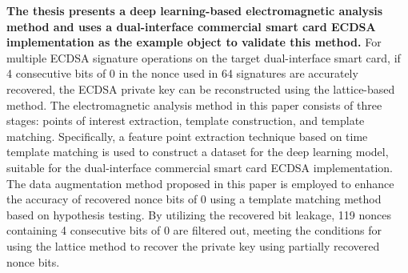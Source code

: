 \textbf{The thesis presents a deep learning-based electromagnetic analysis method and uses a dual-interface commercial smart card ECDSA implementation as the example object to validate this method.} For multiple ECDSA signature operations on the target dual-interface smart card, if 4 consecutive bits of 0 in the nonce used in 64 signatures are accurately recovered, the ECDSA private key can be reconstructed using the lattice-based method. The electromagnetic analysis method in this paper consists of three stages: points of interest extraction, template construction, and template matching. Specifically, a feature point extraction technique based on time template matching is used to construct a dataset for the deep learning model, suitable for the dual-interface commercial smart card ECDSA implementation. The data augmentation method proposed in this paper is employed to enhance the accuracy of recovered nonce bits of 0 using a template matching method based on hypothesis testing. By utilizing the recovered bit leakage, 119 nonces containing 4 consecutive bits of 0 are filtered out, meeting the conditions for using the lattice method to recover the private key using partially recovered nonce bits.

